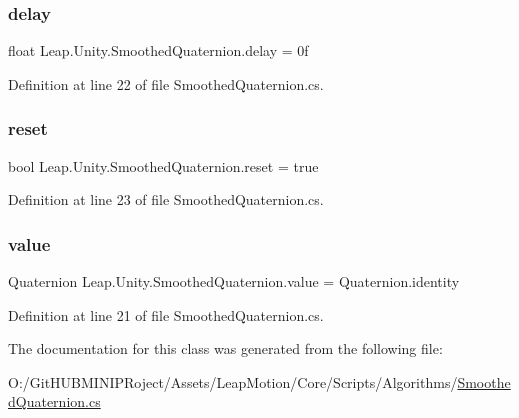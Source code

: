 \subsubsection{\texorpdfstring{delay}{delay}}
{\footnotesize\ttfamily float Leap.\+Unity.\+Smoothed\+Quaternion.\+delay = 0f}



Definition at line 22 of file Smoothed\+Quaternion.\+cs.

\mbox{\label{class_leap_1_1_unity_1_1_smoothed_quaternion_acf878e51a806a1deb2f43e2474b2391d}} 
\subsubsection{\texorpdfstring{reset}{reset}}
{\footnotesize\ttfamily bool Leap.\+Unity.\+Smoothed\+Quaternion.\+reset = true}



Definition at line 23 of file Smoothed\+Quaternion.\+cs.

\mbox{\label{class_leap_1_1_unity_1_1_smoothed_quaternion_a8bf2dc6cd2d9444187044875716f8eb1}} 
\subsubsection{\texorpdfstring{value}{value}}
{\footnotesize\ttfamily Quaternion Leap.\+Unity.\+Smoothed\+Quaternion.\+value = Quaternion.\+identity}



Definition at line 21 of file Smoothed\+Quaternion.\+cs.



The documentation for this class was generated from the following file\+:\begin{DoxyCompactItemize}
\item 
O\+:/\+Git\+H\+U\+B\+M\+I\+N\+I\+P\+Roject/\+Assets/\+Leap\+Motion/\+Core/\+Scripts/\+Algorithms/\mbox{\hyperlink{_smoothed_quaternion_8cs}{Smoothed\+Quaternion.\+cs}}\end{DoxyCompactItemize}
